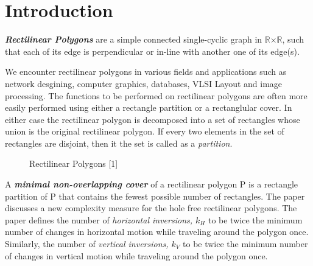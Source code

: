 
\chapter{Introduction} %

\label{Introduction} %


\textbf{\emph{Rectilinear Polygons}} are a simple connected single-cyclic graph in $\mathbb{R}$$\times$$\mathbb{R}$, such that each of its edge is perpendicular or in-line with another one of its edge(s).

We encounter rectilinear polygons in various fields and applications such as network desgining, computer graphics, databases, VLSI Layout and image processing. The functions to be performed on rectilinear polygons are often more easily performed using either a rectangle partition or a rectanglular cover. In either case the rectilinear polygon is decomposed into a set of rectangles whose union is the original rectilinear polygon. If every two elements in the set of rectangles are disjoint, then it the set is called as a \emph{partition}.
\begin{figure}[h]
	\centering
    \caption{ Rectilinear Polygons [1]}
    \label{fig:Rect poly}
\end{figure}

A \textbf{\emph{minimal non-overlapping cover}} of a rectilinear polygon P is a rectangle partition of P that contains the fewest possible number of rectangles. The paper discusses a new complexity measure for the hole free rectilinear polygons. The paper defines the number of \emph{horizontal inversions, $k_{H}$} to be twice the minimum number of changes in horizontal motion while traveling around the polygon once. Similarly, the number of \emph{vertical inversions, $k_{V}$} to be twice the minimum number of changes in vertical motion while traveling around the polygon once.

